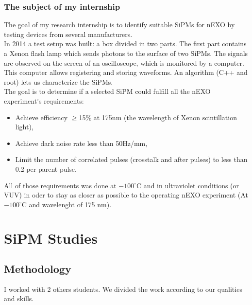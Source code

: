 \documentclass[a4paper, 11pt]{report}%
\newcommand{\xfl}{Xenon flash lamp }
\begin{document}
  \subsection{The subject of my internship}
  
  The goal of my research internship is to identify suitable SiPMs for nEXO by testing devices from several manufacturers.\\
  In 2014 a test setup was built: a box divided in two parts. 
  The first part contains a \xfl which sends photons to the surface of two SiPMs. The signals are observed 
  on the screen of an oscilloscope, which is monitored by a computer. This computer allows registering and storing waveforms. 
  An algorithm (C++ and root) lets us characterize the SiPMs.
  \\
  
  The goal is to determine if a selected SiPM could fulfill all the nEXO experiment's requirements: 
  
  \begin{itemize}\label{item:conditions}
    \item Achieve efficiency \(\geq\)15\% at 175nm (the wavelength of Xenon scintillation light), 
    \item Achieve dark noise rate less than 50Hz/mm\texttwosuperior{}, 
    \item Limit the number of correlated pulses (crosstalk and after pulses) to less than 0.2 per parent pulse.
  \end{itemize}
  
  All of those requirements was done at $-100^{\circ}$C and in ultraviolet conditions (or VUV) in oder to stay as closer as possible to the 
  operating nEXO experiment (At $-100^{\circ}$C and wavelenght of 175 nm). 
  
  

\chapter{SiPM Studies}
  
  \section{Methodology}
  
  I worked with 2 others students.  We divided the work according to our qualities and skills.
  \\
  
\end{document}
